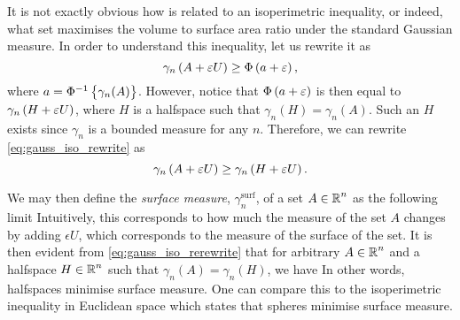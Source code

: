 \documentclass[../main.tex]{subfiles}
\begin{document}
It is not exactly obvious how  is related to an isoperimetric inequality, or indeed, what set maximises the volume to surface area ratio under the standard Gaussian measure. In order to understand this inequality, let us rewrite it as
\begin{equation}
    \label{eq:gauss_iso_rewrite}
    \gamma_n\del{A + \epsilon U}\geq\Phi\del{a + \epsilon},
\end{equation}
where $a = \Phi^{-1}\cbr{\gamma_n(A)}$. However, notice that $\Phi\del{a + \epsilon}$ is then equal to $\gamma_n\del{H + \epsilon U}$, where $H$ is a halfspace such that $\gamma_n(H) = \gamma_n(A)$. Such an $H$ exists since $\gamma_n$ is a bounded measure for any $n$. Therefore, we can rewrite \eqref{eq:gauss_iso_rewrite} as
\begin{equation}
    \label{eq:gauss_iso_rerewrite}
    \gamma_n\del{A + \epsilon U}\geq\gamma_n\del{H + \epsilon U}.
\end{equation}

We may then define the \emph{surface measure}, $\gamma_n^\text{surf}$, of a set $A\in\operatorname{\mathbb{R}}^n$ as the following limit  Intuitively, this corresponds to how much the measure of the set $A$ changes by adding $\epsilon U$, which corresponds to the measure of the surface of the set. It is then evident from \eqref{eq:gauss_iso_rerewrite} that for arbitrary $A\in\operatorname{\mathbb{R}}^n$ and a halfspace $H\in\operatorname{\mathbb{R}}^n$ such that $\gamma_n(A) = \gamma_n(H)$, we have  In other words, halfspaces minimise surface measure. One can compare this to the isoperimetric inequality in Euclidean space which states that spheres minimise surface measure.
\end{document}
